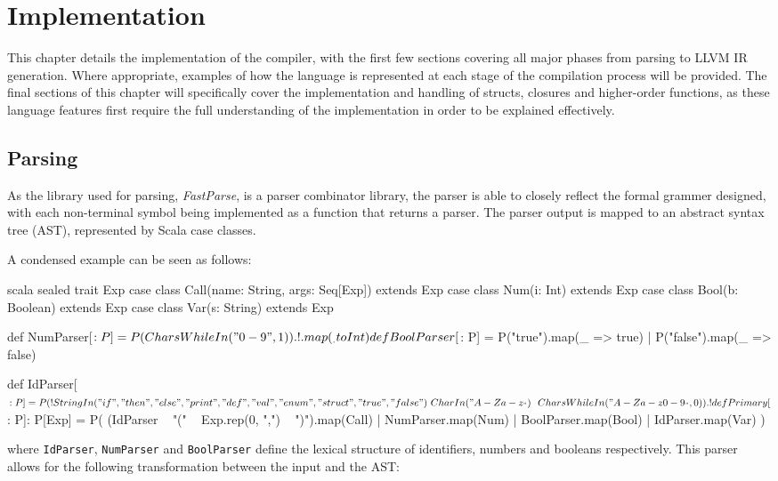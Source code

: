\chapter{Implementation}
\label{ch:implementation}

This chapter details the implementation of the compiler, with the first few sections covering all
major phases from parsing to LLVM IR generation. Where appropriate, examples of how the language is
represented at each stage of the compilation process will be provided. The final sections of this
chapter will specifically cover the implementation and handling of structs, closures and
higher-order functions, as these language features first require the full understanding of the
implementation in order to be explained effectively.

\section{Parsing}

As the library used for parsing, \emph{FastParse}, is a parser combinator library, the parser is
able to closely reflect the formal grammer designed, with each non-terminal symbol being implemented
as a function that returns a parser. The parser output is mapped to an abstract syntax tree (AST),
represented by Scala case classes.

A condensed example can be seen as follows:

\begin{code}{scala}
    sealed trait Exp
    case class Call(name: String, args: Seq[Exp]) extends Exp
    case class Num(i: Int) extends Exp
    case class Bool(b: Boolean) extends Exp
    case class Var(s: String) extends Exp

    def NumParser[$: P] =
        P(CharsWhileIn("0-9", 1)).!.map(_.toInt)

    def BoolParser[$: P] =
        P("true").map(_ => true) |
        P("false").map(_ => false)

    def IdParser[$: P] = P(
        !StringIn("if", "then", "else", "print", "def", "val", "enum", "struct", "true", "false")
        ~ CharIn("A-Za-z_") ~~ CharsWhileIn("A-Za-z0-9_", 0)
    ).!

    def Primary[$: P]: P[Exp] = P(
        (IdParser ~ "(" ~ Exp.rep(0, ",") ~ ")").map(Call) |
        NumParser.map(Num) |
        BoolParser.map(Bool) |
        IdParser.map(Var)
    )
\end{code}

\noindent where \texttt{IdParser}, \texttt{NumParser} and \texttt{BoolParser} define the lexical
structure of identifiers, numbers and booleans respectively. This parser allows for the following
transformation between the input and the AST:


